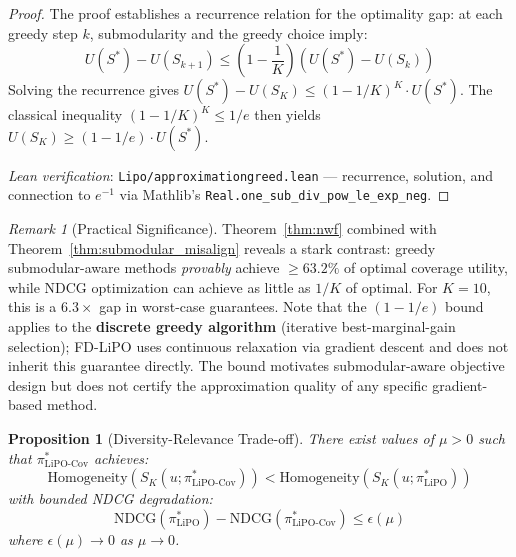 \documentclass[11pt,a4paper]{article}
\theoremstyle{definition}
\theoremstyle{plain}
\newtheorem{proposition}[theorem]{Proposition}
\theoremstyle{remark}
\newtheorem{remark}{Remark}[section]
\newcommand{\NDCG}{\mathrm{NDCG}}
\begin{document}
\begin{proof}
The proof establishes a recurrence relation for the optimality gap: at each greedy step $k$, submodularity and the greedy choice imply:
\begin{equation}
    U(S^*) - U(S_{k+1}) \leq \left(1 - \frac{1}{K}\right)(U(S^*) - U(S_k))
\end{equation}
Solving the recurrence gives $U(S^*) - U(S_K) \leq (1 - 1/K)^K \cdot U(S^*)$. The classical inequality $(1 - 1/K)^K \leq 1/e$ then yields $U(S_K) \geq (1 - 1/e) \cdot U(S^*)$.

\smallskip
\noindent\textit{Lean verification}: \texttt{Lipo/approximationgreed.lean} --- recurrence, solution, and connection to $e^{-1}$ via Mathlib's \texttt{Real.one\_sub\_div\_pow\_le\_exp\_neg}.
\end{proof}

\begin{remark}[Practical Significance]
Theorem~\ref{thm:nwf} combined with Theorem~\ref{thm:submodular_misalign} reveals a stark contrast: greedy submodular-aware methods \textit{provably} achieve $\geq 63.2\%$ of optimal coverage utility, while NDCG optimization can achieve as little as $1/K$ of optimal. For $K = 10$, this is a $6.3\times$ gap in worst-case guarantees. Note that the $(1-1/e)$ bound applies to the \textbf{discrete greedy algorithm} (iterative best-marginal-gain selection); FD-LiPO uses continuous relaxation via gradient descent and does not inherit this guarantee directly. The bound motivates submodular-aware objective design but does not certify the approximation quality of any specific gradient-based method.
\end{remark}

\begin{proposition}[Diversity-Relevance Trade-off]
\label{prop:diversity_tradeoff}
There exist values of $\mu > 0$ such that $\pi^*_{\text{LiPO-Cov}}$ achieves:
\begin{equation}
    \text{Homogeneity}(S_K(u; \pi^*_{\text{LiPO-Cov}})) < \text{Homogeneity}(S_K(u; \pi^*_{\text{LiPO}}))
\end{equation}
with bounded NDCG degradation:
\begin{equation}
    \NDCG(\pi^*_{\text{LiPO}}) - \NDCG(\pi^*_{\text{LiPO-Cov}}) \leq \epsilon(\mu)
\end{equation}
where $\epsilon(\mu) \to 0$ as $\mu \to 0$.
\end{proposition}

\end{document}
